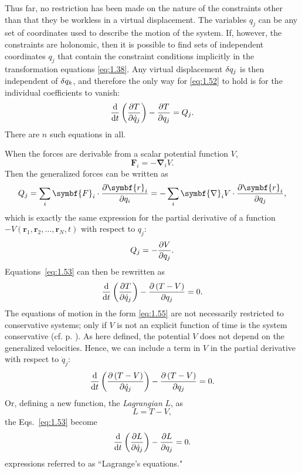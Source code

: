 Thus far, no restriction has been made on the nature of the constraints other than that they be workless in a virtual displacement. The variables \(q_j\) can be any set of coordinates used to describe the motion of the system. If, however, the constraints are holonomic, then it is possible to find sets of independent coordinates \(q_j\) that contain the constraint conditions implicitly in the transformation equations \eqref{eq:1.38}. Any virtual displacement \(\fdif{q_j}\) is then independent of \(\fdif{q_k}\), and therefore the only way for \eqref{eq:1.52} to hold is for the individual coefficients to vanish:
\begin{equation}
    \odv*{\left(\pdv{T}{\dot{q}_j}\right)}{t}-\pdv{T}{q_j}=Q_j.\label{eq:1.53}
\end{equation}
There are \(n\) such equations in all.

When the forces are derivable from a scalar potential function \(V\),
\begin{equation*}
    \symbf{F}_i=-\symbf{\nabla}_iV.
\end{equation*}
Then the generalized forces can be written as
\begin{equation*}
    Q_j=\sum_i\symbf{F}_i\cdot\pdv{\symbf{r}_i}{q_i}=-\sum_i\symbf{\nabla}_iV\cdot\pdv{\symbf{r}_i}{q_j},
\end{equation*}
which is exactly the same expression for the partial derivative of a function \(-V\left(\symbf{r}_1,\symbf{r}_2,\ldots,\symbf{r}_N,t\right)\) with respect to \(q_j\):
\begin{equation}
    Q_j=-\pdv{V}{q_j}.
\end{equation}
Equations~\eqref{eq:1.53} can then be rewritten as
\begin{equation}
    \odv*{\left(\pdv{T}{\dot{q}_j}\right)}{t}-\pdv{\left(T-V\right)}{q_j}=0.\label{eq:1.55}
\end{equation}
The equations of motion in the form \eqref{eq:1.55} are not necessarily restricted to conservative systems; only if \(V\) is not an explicit function of time is the system conservative (cf. p. \pageref{anchor:1.1}). As here defined, the potential \(V\) does not depend on the generalized velocities. Hence, we can include a term in \(V\) in the partial derivative with respect to \(\dot{q}_j\):
\begin{equation*}
    \odv*{\left(\pdv{\left(T-V\right)}{\dot{q}_j}\right)}{t}-\pdv{\left(T-V\right)}{q_j}=0.
\end{equation*}
Or, defining a new function, the \emph{Lagrangian} \(L\), as
\begin{equation}
    L=T-V,\label{eq:1.56}
\end{equation}
the Eqs.~\eqref{eq:1.53} become
\begin{equation}
    \odv*{\left(\pdv{L}{\dot{q}_j}\right)}{t}-\pdv{L}{q_j}=0.\label{eq:1.57}
\end{equation}
expressions referred to as ``Lagrange's equations."


